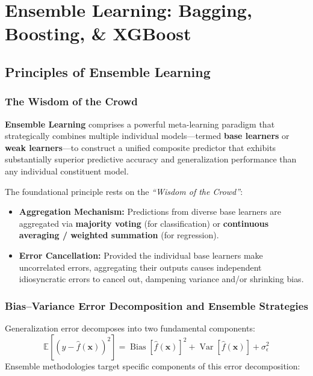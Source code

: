 \chapter{Ensemble Learning: Bagging, Boosting, \& XGBoost}
\label{ch:ensemble_learning}

\section{Principles of Ensemble Learning}

\subsection{The Wisdom of the Crowd}
\textbf{Ensemble Learning} comprises a powerful meta-learning paradigm that strategically combines multiple individual models---termed \textbf{base learners} or \textbf{weak learners}---to construct a unified composite predictor that exhibits substantially superior predictive accuracy and generalization performance than any individual constituent model.

The foundational principle rests on the \textit{``Wisdom of the Crowd''}:
\begin{itemize}
    \item \textbf{Aggregation Mechanism:} Predictions from diverse base learners are aggregated via \textbf{majority voting} (for classification) or \textbf{continuous averaging / weighted summation} (for regression).
    \item \textbf{Error Cancellation:} Provided the individual base learners make uncorrelated errors, aggregating their outputs causes independent idiosyncratic errors to cancel out, dampening variance and/or shrinking bias.
\end{itemize}

\subsection{Bias--Variance Error Decomposition and Ensemble Strategies}
Generalization error decomposes into two fundamental components:
\begin{equation}
    \mathbb{E}[(y - \hat{f}(\mathbf{x}))^2] = \operatorname{Bias}[\hat{f}(\mathbf{x})]^2 + \operatorname{Var}[\hat{f}(\mathbf{x})] + \sigma_\epsilon^2
\end{equation}
Ensemble methodologies target specific components of this error decomposition:

